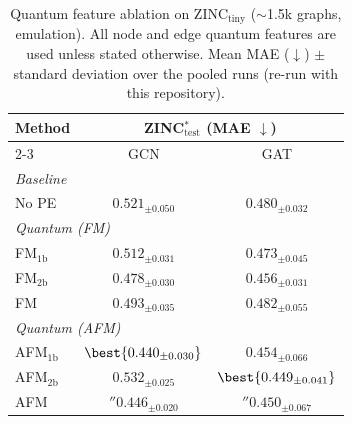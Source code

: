 \begin{table}
\caption{Quantum feature ablation on ZINC$_{\text{tiny}}$ ($\sim$1.5k graphs, emulation). All node and edge quantum features are used unless stated otherwise. Mean MAE ($\downarrow$) $\pm$ standard deviation over the pooled runs (re-run with this repository).}
\label{tab:ablation-zinc-tiny}
\centering
\begin{tabular}{l c c}
\toprule
\multirow{2}{*}{Method} & \multicolumn{2}{c}{ZINC$^{*}_{\text{test}}$ (MAE $\downarrow$)} \\
\cmidrule(lr){2-3}
 & GCN & GAT \\
\midrule
\multicolumn{3}{l}{\textit{Baseline}} \\
  No PE & $0.521{_{\pm 0.050}}$ & $0.480{_{\pm 0.032}}$ \\
\midrule
\multicolumn{3}{l}{\textit{Quantum (FM)}} \\
  FM$_{1\text{b}}$ & $0.512{_{\pm 0.031}}$ & $0.473{_{\pm 0.045}}$ \\
  FM$_{2\text{b}}$ & $0.478{_{\pm 0.030}}$ & $0.456{_{\pm 0.031}}$ \\
  FM & $0.493{_{\pm 0.035}}$ & $0.482{_{\pm 0.055}}$ \\
\midrule
\multicolumn{3}{l}{\textit{Quantum (AFM)}} \\
  AFM$_{1\text{b}}$ & $\best{0.440{_{\pm 0.030}}}$ & $0.454{_{\pm 0.066}}$ \\
  AFM$_{2\text{b}}$ & $0.532{_{\pm 0.025}}$ & $\best{0.449{_{\pm 0.041}}}$ \\
  AFM & $\second{0.446}{_{\pm 0.020}}$ & $\second{0.450}{_{\pm 0.067}}$ \\
\bottomrule
\end{tabular}
\end{table}
